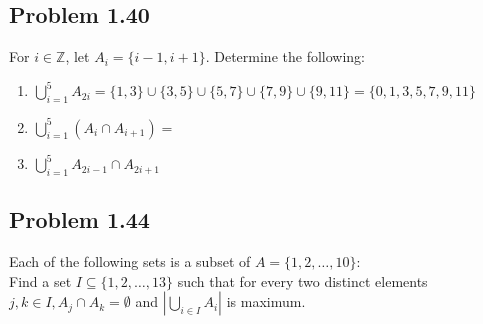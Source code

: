 \documentclass{article}
\newcommand{\Z}{\mathbb{Z}}
\begin{document}
	\subsection*{Problem 1.40}
	For $i\in\Z$, let $A_i=\{i-1,i+1\}$. Determine the following:
	\begin{enumerate}[label=(\alph*)]
		\item $\bigcup\limits_{i=1}^{5} A_{2i}=\{1,3\}\cup\{3,5\}\cup\{5,7\}\cup\{7,9\}\cup\{9,11\}=\{0,1,3,5,7,9,11\}$
		\item $\bigcup\limits_{i=1}^{5} (A_{i}\cap A_{i+1})=$
		\item $\bigcup\limits_{i=1}^{5} A_{2i-1}\cap A_{2i+1}$
		
	\end{enumerate}
	\subsection*{Problem 1.44}
	Each of the following sets is a subset of $A=\{1,2,\dotsc,10\}$:\\
	

	Find a set $I\subseteq\{1,2,\dotsc,13\}$ such that for every two distinct elements $j,k\in I, A_j\cap A_k=\emptyset$ and $|\bigcup_{i\in I}A_i|$ is maximum.
	
	
\end{document}
